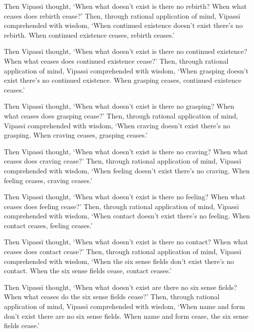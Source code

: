 \documentclass[12pt,openany]{book}%
\begin{document}
Then \textsanskrit{Vipassī} thought, ‘When what doesn’t exist is there no rebirth? When what ceases does rebirth cease?’ Then, through rational application of mind, \textsanskrit{Vipassī} comprehended with wisdom, ‘When continued existence doesn’t exist there’s no rebirth. When continued existence ceases, rebirth ceases.’ 

Then \textsanskrit{Vipassī} thought, ‘When what doesn’t exist is there no continued existence? When what ceases does continued existence cease?’ Then, through rational application of mind, \textsanskrit{Vipassī} comprehended with wisdom, ‘When grasping doesn’t exist there’s no continued existence. When grasping ceases, continued existence ceases.’ 

Then \textsanskrit{Vipassī} thought, ‘When what doesn’t exist is there no grasping? When what ceases does grasping cease?’ Then, through rational application of mind, \textsanskrit{Vipassī} comprehended with wisdom, ‘When craving doesn’t exist there’s no grasping. When craving ceases, grasping ceases.’ 

Then \textsanskrit{Vipassī} thought, ‘When what doesn’t exist is there no craving? When what ceases does craving cease?’ Then, through rational application of mind, \textsanskrit{Vipassī} comprehended with wisdom, ‘When feeling doesn’t exist there’s no craving. When feeling ceases, craving ceases.’ 

Then \textsanskrit{Vipassī} thought, ‘When what doesn’t exist is there no feeling? When what ceases does feeling cease?’ Then, through rational application of mind, \textsanskrit{Vipassī} comprehended with wisdom, ‘When contact doesn’t exist there’s no feeling. When contact ceases, feeling ceases.’ 

Then \textsanskrit{Vipassī} thought, ‘When what doesn’t exist is there no contact? When what ceases does contact cease?’ Then, through rational application of mind, \textsanskrit{Vipassī} comprehended with wisdom, ‘When the six sense fields don’t exist there’s no contact. When the six sense fields cease, contact ceases.’ 

Then \textsanskrit{Vipassī} thought, ‘When what doesn’t exist are there no six sense fields? When what ceases do the six sense fields cease?’ Then, through rational application of mind, \textsanskrit{Vipassī} comprehended with wisdom, ‘When name and form don’t exist there are no six sense fields. When name and form cease, the six sense fields cease.’ 
\end{document}
